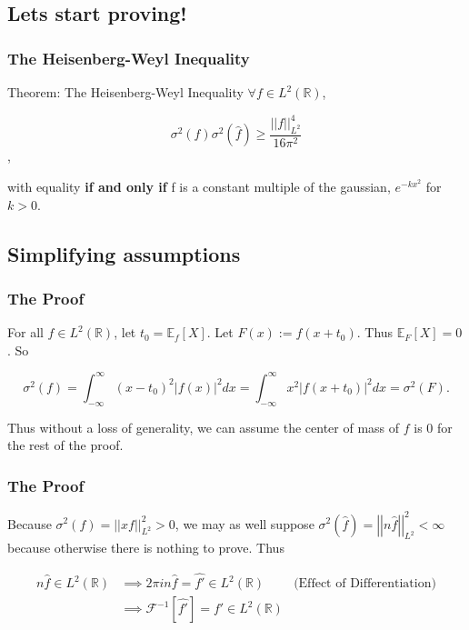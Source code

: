 \documentclass{beamer}
\newcommand{\h}[1]{\hat{#1}}
\newcommand{\R}{\mathbb{R}}
\newcommand{\F}{\mathcal{F}}
\newcommand{\aabs}[1]{\left\lvert\left\lvert #1\right\rvert\right\rvert}
\newcommand{\abs}[1]{\left\lvert #1\right\rvert}
\begin{document}
\subsection{Lets start proving!}
\begin{frame}
    \frametitle{The Heisenberg-Weyl Inequality}

    \begin{block}{Theorem: The Heisenberg-Weyl Inequality}
        $\forall f \in L^2(\R)$, 
        
        \[
            \sigma^2(f)\sigma^2(\h{f}) \geq \frac{\aabs{f}_{L^2}^4}{16 \pi^2}
        \],

        with equality \textbf{if and only if} f is a constant multiple of the gaussian, $e^{-kx^2}$ for $k > 0$.    
    \end{block}

\end{frame}

\subsection{Simplifying assumptions}

\begin{frame}
    \frametitle{The Proof}

    For all $f \in L^2(\R)$, let $t_0 = \mathbb{E}_f[X]$. Let $F(x) := f(x + t_0)$. Thus $\mathbb{E}_{F}[X] = 0$. So
        
    \[\sigma^2(f) = \int_{-\infty}^{\infty}(x - t_0)^2 \abs{f(x)}^2 dx = \int_{-\infty}^{\infty}x^2 \abs{f(x + t_0)}^2 dx = \sigma^2(F). \]

    Thus without a loss of generality, we can assume the center of mass of $f$ is 0 for the rest of the proof.  

\end{frame}

\begin{frame}
    \frametitle{The Proof}

    Because $\sigma^2(f) = \aabs{xf}_{L^2}^2 > 0$, we may as well suppose $\sigma^2(\h{f}) = \aabs{n\h{f}}_{L^2}^2 < \infty$ because otherwise there is nothing to prove. Thus 
        
        \begin{align*}
            n\h{f} \in L^2(\R) &\implies 2 \pi i n \h{f} = \h{f'} \in L^2(\R) & \text{(Effect of Differentiation)}\\
            &\implies \F^{-1}[\h{f'}] = f' \in L^2(\R)
        \end{align*}

\end{frame}
\end{document}
